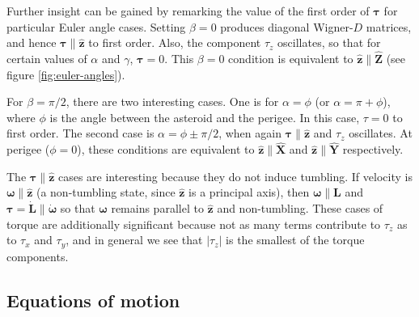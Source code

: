 \documentclass[fleqn,usenatbib]{mnras}
\newcommand{\unit}[1]{\bm{\hat{#1}}}
\begin{document}
Further insight can be gained by remarking the value of the first order of $\bm \tau$ for particular Euler angle cases. Setting $\beta = 0$ produces diagonal Wigner-$D$ matrices, and hence $\bm \tau \parallel \unit z$ to first order. Also, the component $\tau_z$ oscillates, so that for certain values of $\alpha$ and $\gamma$, $\bm \tau = 0.$ This $\beta=0$ condition is equivalent to $\unit z \parallel \unit Z$ (see figure \ref{fig:euler-angles}).

For $\beta = \pi/2$, there are two interesting cases. One is for $\alpha = \phi$ (or $\alpha = \pi + \phi$), where $\phi$ is the angle between the asteroid and the perigee. In this case, $\tau = 0$ to first order. The second case is $\alpha = \phi \pm \pi/2$, when again $\bm \tau \parallel \unit z$ and $\tau_z$ oscillates. At perigee ($\phi=0$), these conditions are equivalent to $\unit z \parallel \unit X$ and $\unit z \parallel \unit Y$ respectively.

The $\bm \tau \parallel \unit z$ cases are interesting because they do not induce tumbling. If velocity is $\bm \omega \parallel \unit z$ (a non-tumbling state, since $\unit z$ is a principal axis), then $\bm \omega \parallel \bm L$ and $\bm \tau = \dot{\bm L} \parallel \dot{\bm \omega}$ so that $\bm \omega$ remains parallel to $\unit z$ and non-tumbling. These cases of torque are additionally significant because not as many terms contribute to $\tau_z$ as to $\tau_x$ and $\tau_y$, and in general we see that $|\tau_z|$ is the smallest of the torque components.

\subsection{Equations of motion}
\label{sec:eom}
\end{document}

